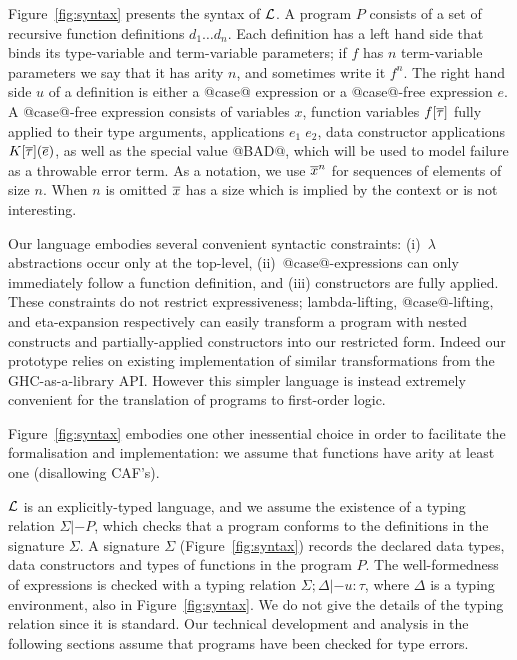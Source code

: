 Figure~\ref{fig:syntax} presents the syntax of $\cal L$.  A program
$P$ consists of a set of recursive function definitions $d_1 \ldots
d_n$. Each definition has a left hand side that binds its type-variable and
term-variable parameters;
if $f$ has $n$ term-variable parameters we say that
it has arity $n$, and sometimes write it $f^n$.
The right hand side $u$ of a definition is either a @case@ expression or a
@case@-free expression $e$.  A @case@-free expression consists of
variables $x$, function variables $f[\overline{\tau}]$ fully applied to their
type arguments, applications $e_1\;e_2$, data constructor applications
$K[\overline{\tau}](\overline{e})$, as well as the special value @BAD@, which will be
used to model failure as a throwable error term. As a notation, we use
$\overline{x}^{n}$ for sequences of elements of size $n$. When $n$ is
omitted $\overline{x}$ has a size which is implied by the context or is not
interesting.

Our language embodies several convenient syntactic constraints: (i)~$\lambda$
abstractions occur only at the top-level, (ii)~@case@-expressions can
only immediately follow a function definition, and (iii) constructors
are fully applied.  These constraints do not restrict expressiveness;
lambda-lifting, @case@-lifting, and eta-expansion respectively can
easily transform a program with nested constructs and
partially-applied constructors into our restricted form.  Indeed our
prototype relies on existing implementation of similar transformations
from the GHC-as-a-library API. However this simpler language is
instead extremely convenient for the translation of programs to
first-order logic.

Figure~\ref{fig:syntax} embodies one other inessential choice in order to
facilitate the formalisation and implementation: we assume that
functions have arity at least one (disallowing CAF's).   

$\cal L$ is an explicitly-typed language, and we assume the existence
of a typing relation $\Sigma |- P$, which checks that a program
conforms to the definitions in the signature $\Sigma$. A signature
$\Sigma$ (Figure~\ref{fig:syntax}) records the declared data types,
data constructors and types of functions in the program $P$. The
well-formedness of expressions is checked with a typing relation
$\Sigma;\Delta |- u : \tau$, where $\Delta$ is a typing environment,
also in Figure~\ref{fig:syntax}.  We do not give the details of the
typing relation since it is standard.
Our technical development and analysis in the following sections
assume that programs have been checked for type errors.

